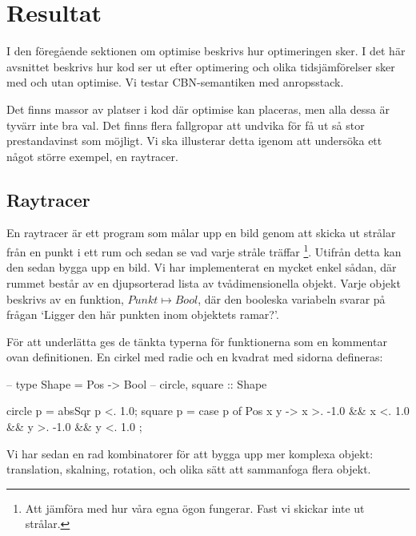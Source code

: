 \documentclass[Rapport]{subfiles}
\begin{document}
\section{Resultat}
\label{sec:Resultat}


I den föregående sektionen om optimise beskrivs hur optimeringen sker.
I det här avsnittet beskrivs hur kod ser ut efter optimering och 
olika tidsjämförelser sker med och utan optimise. 
Vi testar CBN-semantiken med anropsstack.

Det finns massor av platser i kod där optimise kan placeras, men alla dessa är tyvärr 
inte bra val. Det finns flera fallgropar att undvika för få ut så stor 
prestandavinst som möjligt. Vi ska illusterar detta igenom att undersöka ett 
något större exempel, en raytracer.

\subsection{Raytracer}


En raytracer är ett program som målar upp en bild genom att skicka ut strålar från en punkt
i ett rum och sedan se vad varje stråle träffar
\footnote{Att jämföra med hur våra egna ögon fungerar. 
          Fast vi skickar inte ut strålar.}.
Utifrån detta kan den sedan bygga upp en bild. Vi har implementerat
en mycket enkel sådan, där rummet består av en djupsorterad lista av tvådimensionella objekt.
Varje objekt beskrivs av en funktion, $Punkt \mapsto Bool$, där den booleska
variabeln svarar på frågan `Ligger den här punkten inom objektets ramar?'.

För att underlätta ges de tänkta typerna för funktionerna som en kommentar ovan definitionen.
En cirkel med radie  och en kvadrat med sidorna  defineras:
\begin{codeEx}
-- type Shape = Pos -> Bool
-- circle, square :: Shape

circle p = absSqr p <. 1.0;
square p = case p of
    { Pos x y -> x >. -1.0 && x <. 1.0
              && y >. -1.0 && y <. 1.0
    };
\end{codeEx}

Vi har sedan en rad kombinatorer för att bygga upp mer komplexa objekt:
translation, skalning, rotation, och olika sätt att sammanfoga flera objekt.

\end{document}
